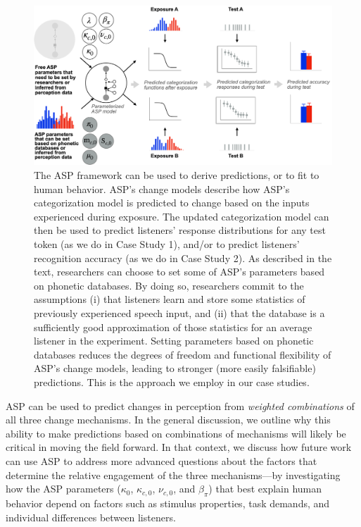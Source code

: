 \documentclass[
  11pt,
  man,floatsintext]{apa6}
\begin{document}
\begin{figure}[h]
\begin{center}
\includegraphics[width=.99\columnwidth]{../figures/diagrams/predictive-power-simulations.png}
\caption{The ASP framework can be used to derive predictions, or to fit to human behavior. ASP's change models describe how ASP's categorization model is predicted to change based on the inputs experienced during exposure. The updated categorization model can then be used to predict listeners' response distributions for any test token (as we do in Case Study 1), and/or to predict listeners' recognition accuracy (as we do in Case Study 2). As described in the text, researchers can choose to set some of ASP's parameters based on phonetic databases. By doing so, researchers commit to the assumptions (i) that listeners learn and store some statistics of previously experienced speech input, and (ii) that the database is a sufficiently good approximation of those statistics for an average listener in the experiment. Setting parameters based on phonetic databases reduces the degrees of freedom and functional flexibility of ASP's change models, leading to stronger (more easily falsifiable) predictions. This is the approach we employ in our case studies.}\label{fig:ASP-predictions}
\end{center}
\end{figure}

ASP can be used to predict changes in perception from \emph{weighted combinations} of all three change mechanisms. In the general discussion, we outline why this ability to make predictions based on combinations of mechanisms will likely be critical in moving the field forward. In that context, we discuss how future work can use ASP to address more advanced questions about the factors that determine the relative engagement of the three mechanisms---by investigating how the ASP parameters (\(\kappa_0\), \(\kappa_{c,0}\), \(\nu_{c,0}\), and \(\beta_{\pi}\)) that best explain human behavior depend on factors such as stimulus properties, task demands, and individual differences between listeners.
\end{document}
